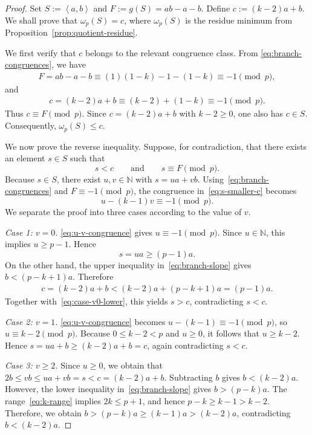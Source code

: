 \documentclass[reqno, 12pt]{article}
\numberwithin{equation}{section}
\theoremstyle{definition}
\newcommand{\NN}{\mathbb{N}}
\newcommand{\gen}[1]{\left\langle #1\right\rangle}
\begin{document}
\begin{proof}
Set $S:=\gen{a,b}$ and $F:=g(S)=ab-a-b$.
Define  $c:=(k-2)a+b$. We shall prove that $\omega_p(S)=c$, where $\omega_p(S)$ is the residue minimum from Proposition~\ref{prop:quotient-residue}.

We first verify that $c$ belongs to the relevant congruence class. 
From \cref{eq:branch-congruences}, we have 
\begin{align*}
F=ab-a-b \equiv(1)(1-k)-1-(1-k)\equiv-1 \pmod p,
\end{align*}
and
\begin{align*}
c=(k-2)a+b \equiv(k-2)+(1-k)\equiv-1 \pmod p.
\end{align*}
Thus $c\equiv F\pmod p$.
Since $c=(k-2)a+b$ with $k-2\ge0$, one also has $c\in S$. Consequently, $\omega_p(S)\le c$.

We now prove the reverse inequality.  Suppose, for contradiction, that there
exists an element $s\in S$ such that
\begin{equation}\label{eq:s-smaller-c}
  s<c
  \qquad\text{and}\qquad
  s\equiv F\pmod p.
\end{equation}
Because $s\in S$, there exist $u,v\in\NN$ with $s=ua+vb$.
Using~\cref{eq:branch-congruences} and
$F\equiv-1\pmod p$, the congruence in~\cref{eq:s-smaller-c} becomes
\begin{equation}\label{eq:u-v-congruence}
  u-(k-1)v\equiv-1\pmod p.
\end{equation}
We separate the proof into three cases according to the value of $v$.

\smallskip
\noindent\emph{Case 1: $v=0$.} \cref{eq:u-v-congruence} gives $u\equiv-1\pmod p$.
Since $u\in\NN$, this implies $u\ge p-1$.  Hence
\begin{equation}\label{eq:case-v0-lower}
  s=ua\ge(p-1)a.
\end{equation}
On the other hand, the upper inequality in~\cref{eq:branch-slope} gives $b<(p-k+1)a$.
Therefore
\begin{align*}
c=(k-2)a+b<(k-2)a+(p-k+1)a=(p-1)a.
\end{align*}
Together with~\cref{eq:case-v0-lower}, this yields $s>c$, contradicting
$s<c$.

\smallskip
\noindent\emph{Case 2: $v=1$.} \cref{eq:u-v-congruence} becomes $u-(k-1)\equiv-1\pmod p$, so $u\equiv k-2\pmod p$.
Because $0\le k-2<p$ and $u\ge0$, it follows that $u\ge k-2$.  Hence $s=ua+b\ge(k-2)a+b=c$, again contradicting $s<c$.

\smallskip
\noindent\emph{Case 3: $v\ge2$.}
Since $u\ge0$, we obtain that $2b\le vb\le ua+vb=s<c=(k-2)a+b$.
Subtracting $b$ gives $b<(k-2)a$.
However, the lower inequality in~\cref{eq:branch-slope} gives $b>(p-k)a$.
The range~\cref{eq:k-range} implies $2k\le p+1$,
and hence $p-k\ge k-1>k-2$.
Therefore, we obtain $b>(p-k)a\ge(k-1)a>(k-2)a$, contradicting $b<(k-2)a$.


\end{proof}
\end{document}
